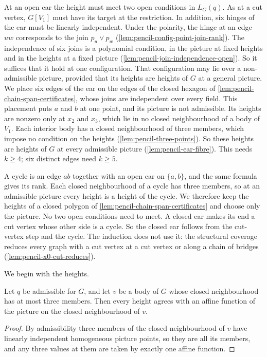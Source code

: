 At an open ear the height must meet two open conditions in $L_G(q)$. As
at a cut vertex, $G[V_1]$ must have its target at the restriction. In
addition, six hinges of the ear must be linearly independent. Under the
polarity, the hinge at an edge $uw$ corresponds to the join
$p_u \vee p_w$ (\cref{lem:pencil-config-point-join-rank}). The
independence of six joins is a polynomial condition, in the picture at
fixed heights and in the heights at a fixed picture
(\cref{lem:pencil-join-independence-open}). So it suffices that it hold
at one configuration. That configuration may lie over a non-admissible
picture, provided that its heights are heights of $G$ at a general
picture. We place six edges of the ear on the edges of the closed
hexagon of \cref{lem:pencil-chain-span-certificates}, whose joins are
independent over every field. This placement puts $a$ and $b$ at one
point, and its picture is not admissible. Its heights are nonzero only
at $x_2$ and $x_3$, which lie in no closed neighbourhood of a body of
$V_1$. Each interior body has a closed neighbourhood of three members,
which impose no condition on the heights
(\cref{lem:pencil-three-points}). So these
heights are heights of $G$ at every admissible picture
(\cref{lem:pencil-ear-fibre}). This needs $k \ge 4$; six distinct edges
need $k \ge 5$.

A cycle is an edge $ab$ together with an open ear on $\{a, b\}$, and the
same formula gives its rank. Each closed neighbourhood of a cycle has
three members, so at an admissible picture every height is a height of
the cycle. We therefore keep the heights of a closed polygon of
\cref{lem:pencil-chain-span-certificates} and choose only the picture.
No two open conditions need to meet. A closed ear makes its end a cut
vertex whose other side is a cycle. So the closed ear follows from the
cut-vertex step and the cycle. The induction does not use it: the
structural coverage reduces every graph with a cut vertex at a cut vertex
or along a chain of bridges (\cref{lem:pencil-x0-cut-reduces}).

We begin with the heights.

\begin{lemma}
  \label{lem:pencil-three-points}
  \leanok
  Let $q$ be admissible for $G$, and let $v$ be a body of $G$ whose
  closed neighbourhood has at most three members. Then every height
  agrees with an affine function of the picture on the closed
  neighbourhood of $v$.
\end{lemma}
\begin{proof}
  \leanok
  By admissibility three members of the closed neighbourhood of $v$
  have linearly independent homogeneous picture points, so they are all
  its members, and any three values at them are taken by exactly one
  affine function.
\end{proof}

